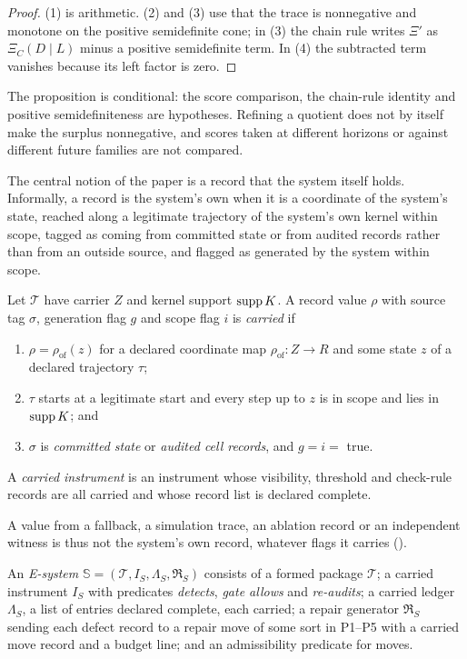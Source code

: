 \begin{proof}
(1) is arithmetic. (2) and (3) use that the trace is nonnegative and monotone on the positive
semidefinite cone; in (3) the chain rule writes $\Xi'$ as $\Xi_C(D\mid L)$ minus a positive
semidefinite term. In (4) the subtracted term vanishes because its left factor is zero.
\end{proof}

The proposition is conditional: the score comparison, the chain-rule identity and positive
semidefiniteness are hypotheses. Refining a quotient does not by itself make the surplus
nonnegative, and scores taken at different horizons or against different future families are not
compared.

The central notion of the paper is a record that the system itself holds. Informally, a record is
the system's own when it is a coordinate of the system's state, reached along a legitimate trajectory
of the system's own kernel within scope, tagged as coming from committed state or from audited
records rather than from an outside source, and flagged as generated by the system within scope.

\begin{definition}\label{def:d3}
Let $\mathcal T$ have carrier $Z$ and kernel support $\operatorname{supp} K$. A record value $\rho$ with source tag
$\sigma$, generation flag $g$ and scope flag $i$ is \emph{carried} if
\begin{enumerate}
  \item $\rho = \rho_{\mathrm{of}}(z)$ for a declared coordinate map $\rho_{\mathrm{of}} : Z \to R$
    and some state $z$ of a declared trajectory $\tau$;
  \item $\tau$ starts at a legitimate start and every step up to $z$ is in scope and lies in
    $\operatorname{supp} K$; and
  \item $\sigma$ is \emph{committed state} or \emph{audited cell records}, and $g = i = $ true.
\end{enumerate}
A \emph{carried instrument} is an instrument whose visibility, threshold and check-rule records are
all carried and whose record list is declared complete.
\end{definition}

A value from a fallback, a simulation trace, an ablation record or an independent witness is thus
not the system's own record, whatever flags it carries ().

\begin{definition}\label{def:d4}
An \emph{E-system} $\mathbb S = (\mathcal T, I_S, \Lambda_S, \mathfrak R_S)$ consists of a formed
package $\mathcal T$; a carried instrument $I_S$ with predicates \emph{detects}, \emph{gate allows}
and \emph{re-audits}; a carried ledger $\Lambda_S$, a list of entries declared complete, each
carried; a repair generator $\mathfrak R_S$ sending each defect record to a repair move of some sort
in P1--P5 with a carried move record and a budget line; and an admissibility predicate for moves.
\end{definition}

